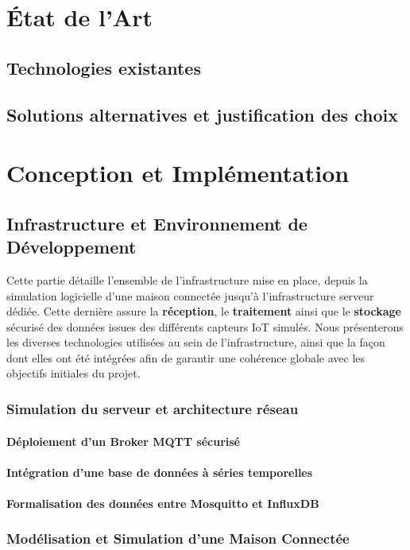 \documentclass[10pt, a4paper]{report}
\begin{document}
	\chapter{État de l'Art}
	\section{Technologies existantes}
	\section{Solutions alternatives et justification des choix}
	
	\chapter{Conception et Implémentation}
	
	\section{Infrastructure et Environnement de Développement}
	Cette partie détaille l'ensemble de l’infrastructure mise en place, depuis la simulation logicielle d'une maison connectée jusqu'à l'infrastructure serveur dédiée. Cette dernière assure la \textbf{réception}, le \textbf{traitement} ainsi que le \textbf{stockage} sécurisé des données issues des différents capteurs IoT simulés. Nous présenterons les diverses technologies utilisées au sein de l'infrastructure, ainsi que la façon dont elles ont été intégrées afin de garantir une cohérence globale avec les objectifs initiales du projet.
	\subsection{Simulation du serveur et architecture réseau}
	\subsubsection{Déploiement d'un Broker MQTT sécurisé}
	\subsubsection{Intégration d'une base de données à séries temporelles}
	\subsubsection{Formalisation des données entre Mosquitto et InfluxDB}
	
	\subsection{Modélisation et Simulation d'une Maison Connectée}
\end{document}
